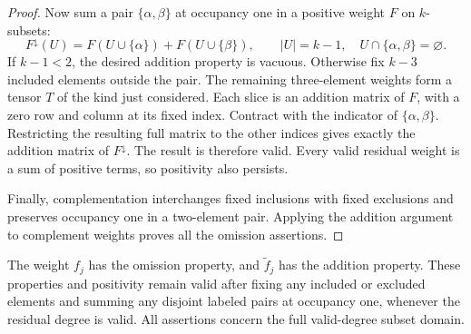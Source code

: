 \begin{proof}
Now sum a pair \(\{\alpha,\beta\}\) at occupancy one in a positive
weight \(F\) on \(k\)-subsets:
\[
 F^\downarrow(U)=F(U\cup\{\alpha\})+F(U\cup\{\beta\}),
 \qquad
 |U|=k-1,\quad
 U\cap\{\alpha,\beta\}=\varnothing.
\]
If \(k-1<2\), the desired addition property is vacuous.
Otherwise fix \(k-3\) included elements outside the pair.
The remaining three-element weights form a tensor \(T\) of the
kind just considered.
Each slice is an addition matrix of \(F\), with a zero row and
column at its fixed index.
Contract with the indicator of \(\{\alpha,\beta\}\).
Restricting the resulting full matrix to the other indices gives
exactly the addition matrix of \(F^\downarrow\).
The result is therefore valid.
Every valid residual weight is a sum of positive terms, so
positivity also persists.

Finally, complementation interchanges fixed inclusions with fixed
exclusions and preserves occupancy one in a two-element pair.
Applying the addition argument to complement weights proves all
the omission assertions.
\end{proof}

\begin{lemma}
\label{lem:binary-signatures}
The weight \(f_j\) has the omission property, and
\(\widetilde f_j\) has the addition property.
These properties and positivity remain valid after fixing any
included or excluded elements and summing any disjoint labeled
pairs at occupancy one, whenever the residual degree is valid.
All assertions concern the full valid-degree subset domain.
\end{lemma}

